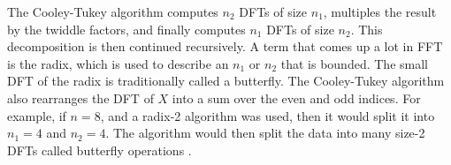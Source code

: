             The Cooley-Tukey algorithm computes $n_2$ DFTs of size $n_1$, multiples the
            result by the twiddle factors, and finally computes $n_1$ DFTs of size
            $n_2$. This decomposition is then continued recursively. A term that comes up a
            lot in FFT is the radix, which is used to describe an $n_1$ or $n_2$ that is
            bounded. The small DFT of the radix is traditionally called a butterfly. The
            Cooley-Tukey algorithm also rearranges the DFT of $X$ into a sum over the even
            and odd indices.
            For example, if $n=8$, and a radix-2 algorithm was used, then it would split it
            into $n_1=4$ and $n_2=4$. The algorithm would then split the data into many
            size-2 DFTs called butterfly operations \cite{frigo2005design}.
%
%
%
%
